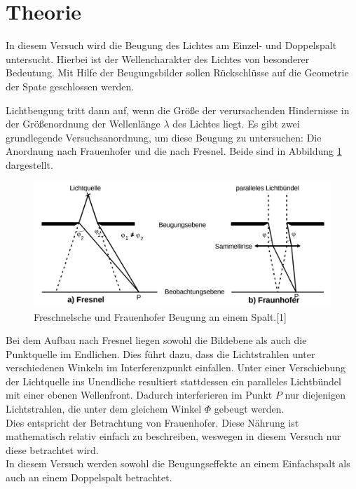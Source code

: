 \section{Theorie}
\label{sec:Theorie}

In diesem Versuch wird die Beugung des Lichtes am Einzel- und Doppelspalt untersucht. Hierbei ist der
Wellencharakter des Lichtes von besonderer Bedeutung. Mit Hilfe der Beugungsbilder sollen Rückschlüsse 
auf die Geometrie der Spate geschlossen werden. 

Lichtbeugung tritt dann auf, wenn die Größe der verursachenden Hindernisse in der Größenordnung der 
Wellenlänge $\lambda$ des Lichtes liegt. Es gibt zwei grundlegende Versuchsanordnung, um diese Beugung
zu untersuchen: Die Anordnung nach Frauenhofer und die nach Fresnel. Beide sind in Abbildung \ref{fig:Beugungen} 
dargestellt.

\begin{figure}
  \centering
  \includegraphics[scale=0.3]{content/Begungen.jpg}
  \caption{Freschnelsche und Frauenhofer Beugung an einem Spalt.[1]}
  \label{fig:Beugungen}
\end{figure}

Bei dem Aufbau nach Fresnel liegen sowohl die Bildebene als auch die Punktquelle im Endlichen. Dies 
führt dazu, dass die Lichtstrahlen unter verschiedenen Winkeln im Interferenzpunkt einfallen. Unter einer
Verschiebung der Lichtquelle ins Unendliche resultiert stattdessen ein paralleles Lichtbündel mit einer 
ebenen Wellenfront. Dadurch interferieren im Punkt $P$ nur diejenigen Lichtstrahlen, die unter dem gleichem 
Winkel $\Phi$ gebeugt werden. \\
Dies entspricht der Betrachtung von Frauenhofer. Diese Nährung ist mathematisch 
relativ einfach zu beschreiben, weswegen in diesem Versuch nur diese betrachtet wird.\\ 

In diesem Versuch werden sowohl die Beugungseffekte an einem Einfachspalt als auch an einem 
Doppelspalt betrachtet. 

